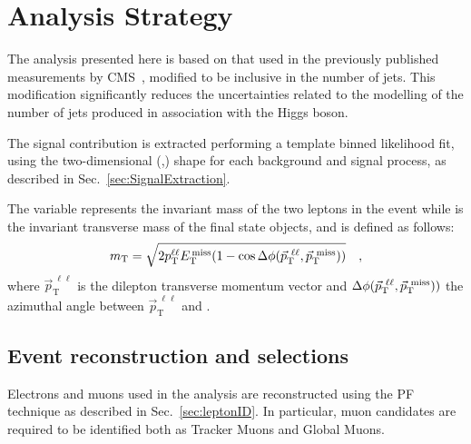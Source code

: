 \section{Analysis Strategy}
\label{sec:AnalysisStrategy}

The analysis presented here is based on that used in the previously published \hwwllnn
measurements by CMS~\cite{Chatrchyan:2013iaa}, modified to be inclusive in the number of jets. 
This modification significantly reduces the uncertainties related to the modelling of the number of jets produced in association with the Higgs boson.

The signal contribution is extracted performing a template binned likelihood fit, using the two-dimensional (\mll,\mt) shape for each background and signal process, as described in Sec.~\ref{sec:SignalExtraction}.

The \mll variable represents the invariant mass of the two leptons in the event while \mt is the invariant transverse mass of the final state objects, and is defined as follows:
\begin{equation}
m_\mathrm{T} = \sqrt{2p_\mathrm{T}^{\ell\ell}E_\mathrm{T}^\mathrm{\,miss}(1-\cos\Delta\phi(\vec{p}_\mathrm{T}^{~\ell\ell},\vec{p}_\mathrm{T}^\mathrm{~miss}))} \quad ,
\end{equation}
\noindent where $\vec{p}_\mathrm{T}^{~\ell\ell}$ is the dilepton transverse momentum vector and $\Delta\phi(\vec{p}_\mathrm{T}^{~\ell\ell},\vec{p}_\mathrm{T}^\mathrm{~miss}))$ the azimuthal angle between $\vec{p}_\mathrm{T}^{~\ell\ell}$ and \ptmiss.

\subsection{Event reconstruction and selections}\label{sec:Selections}

Electrons and muons used in the analysis are reconstructed using the PF technique as described in Sec.~\ref{sec:leptonID}. In particular, muon candidates are required to be identified both as Tracker Muons and Global Muons.

